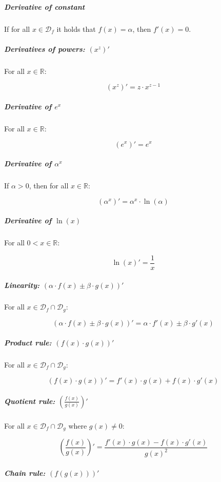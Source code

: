 \documentclass[titlepage]{article}
\begin{document}
            \subparagraph{Derivative of constant}

              If for all $x \in \mathcal{D}_f$ it holds that $f(x) = \alpha$,
              then $f'(x) = 0$.

            \subparagraph{Derivatives of powers: $\left( x^z \right)'$}

              For all $x \in \mathbb{R}$:

              $$\left( x^z \right)' =z \cdot x^{z - 1}$$

            \subparagraph{Derivative of $e^x$}

              For all $x \in \mathbb{R}$:

              $$\left( e^x \right)' = e^x$$

            \subparagraph{Derivative of $\alpha^x$}

              If $\alpha > 0$, then for all $x \in \mathbb{R}$:

              $$\left( \alpha^x \right)' = \alpha^x \cdot \ln(\alpha)$$

            \subparagraph{Derivative of $\ln(x)$}

              For all $0 < x \in \mathbb{R}$:

              $$\ln(x)' = \frac{1}{x}$$

            \subparagraph{%
              Linearity: $(\alpha \cdot f(x) \pm \beta \cdot g(x))'$
            }

              For all $x \in \mathcal{D}_f \cap \mathcal{D}_g$:

              $$
                (\alpha \cdot f(x) \pm \beta \cdot g(x))'
                  = \alpha \cdot f'(x) \pm \beta \cdot g'(x)
              $$

            \subparagraph{Product rule: $(f(x) \cdot g(x))'$}

              For all $x \in \mathcal{D}_f \cap \mathcal{D}_g$:

              $$(f(x) \cdot g(x))' = f'(x) \cdot g(x) + f(x) \cdot g'(x)$$

            \subparagraph{Quotient rule: $\left( \frac{f(x)}{g(x)} \right)'$}

              For all $x \in \mathcal{D}_f \cap \mathcal{D}_g$ where
              $g(x) \neq 0$:

              $$
                \left( \frac{f(x)}{g(x)} \right)'
                  = \frac{f'(x) \cdot g(x) - f(x) \cdot g'(x)}{g(x)^2}
              $$

            \subparagraph{Chain rule: $(f(g(x)))'$}
\end{document}
